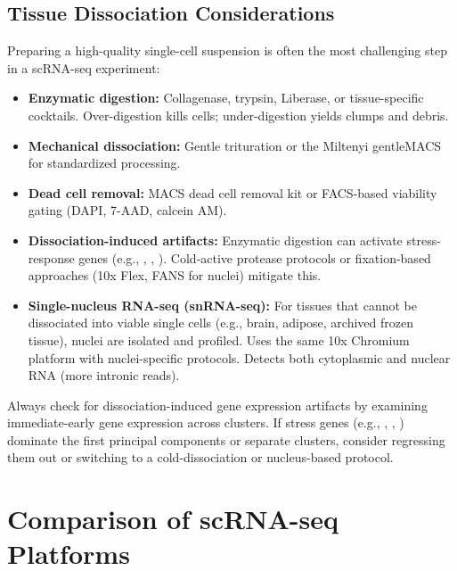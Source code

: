 \subsection{Tissue Dissociation Considerations}

Preparing a high-quality single-cell suspension is often the most challenging
step in a scRNA-seq experiment:

\begin{itemize}[nosep]
  \item \textbf{Enzymatic digestion:} Collagenase, trypsin, Liberase, or
    tissue-specific cocktails. Over-digestion kills cells; under-digestion
    yields clumps and debris.
  \item \textbf{Mechanical dissociation:} Gentle trituration or the
    Miltenyi gentleMACS for standardized processing.
  \item \textbf{Dead cell removal:} MACS dead cell removal kit or FACS-based
    viability gating (DAPI, 7-AAD, calcein AM).
  \item \textbf{Dissociation-induced artifacts:} Enzymatic digestion can
    activate stress-response genes (e.g., , ,
    ). Cold-active protease protocols or fixation-based approaches
    (10x Flex, FANS for nuclei) mitigate this.
  \item \textbf{Single-nucleus RNA-seq (snRNA-seq):} For tissues that cannot be
    dissociated into viable single cells (e.g., brain, adipose, archived frozen
    tissue), nuclei are isolated and profiled. Uses the same 10x Chromium
    platform with nuclei-specific protocols. Detects both cytoplasmic and
    nuclear RNA (more intronic reads).
\end{itemize}

\begin{warningbox}
Always check for dissociation-induced gene expression artifacts by examining
immediate-early gene expression across clusters. If stress genes (e.g.,
, , ) dominate the first principal components
or separate clusters, consider regressing them out or switching to a
cold-dissociation or nucleus-based protocol.
\end{warningbox}


\section{Comparison of scRNA-seq Platforms}
\label{sec:scrnaseq:comparison}


